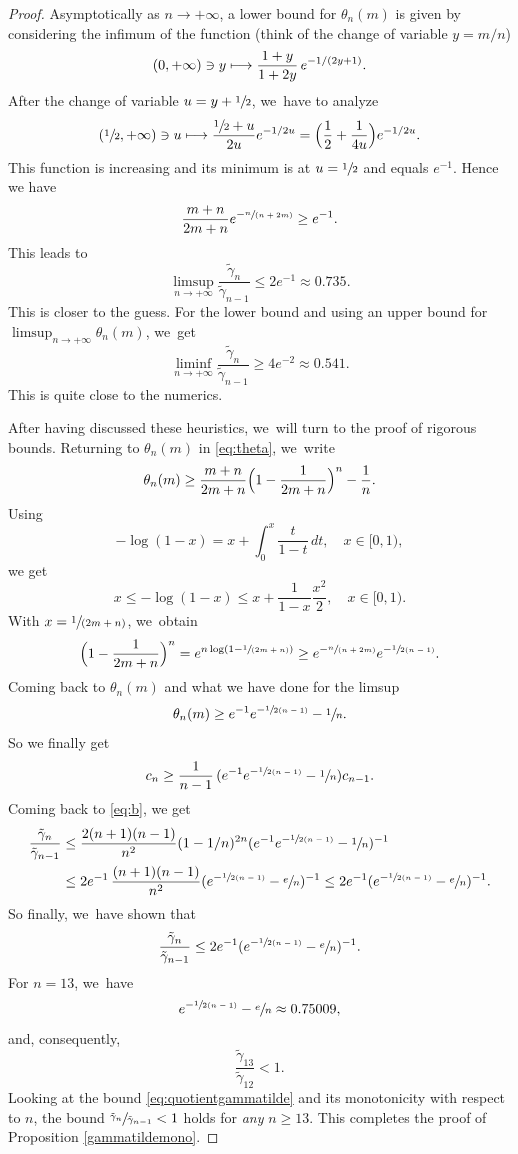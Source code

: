 \documentclass[11pt]{article}
\newcommand\mto{\mathchoice{\longmapsto}{\mapsto}{\mapsto}{\mapsto}}
\let\oldsfrac\sfrac
\renewcommand{\sfrac}[2]{{\oldsfrac{#1}{#2}}}
\newcommand{\spfrac}[2]{{\sfrac{#1}{(#2)}}}
\theoremstyle{definition}
\newcommand{\1}{\mathbbm{1}}
\numberwithin{equation}{section}
\begin{document}
\begin{proof}
Asymptotically as $n\to +\infty$, a lower bound for $\theta_n(m)$ is given by considering the infimum of the function (think of the change of variable $y=m/n$)
\[
(0,+\infty) \ni y \mto \frac{1+y}{1+2y}\,e^{-1/(2y+1)}.
\]
After the change of variable $u=y+\sfrac 12$, we~have to analyze
\[
(\sfrac 12,+\infty) \ni u \mto \frac{\sfrac12 +u}{2u} e^{-1/2u}= \Bigl(\frac 12 + \frac{1}{4u}\Bigr) e^{-1/2u}.
\]
This function is increasing and its minimum is at $u=\sfrac 12$ and equals $e^{-1}$. Hence we have
\begin{equation}
\frac{m+n}{2m+n}e^{- \spfrac{n}{n+2m}} \geq e^{-1}.
\end{equation}
This leads to
\begin{equation}\label{eq:expdecaytildegammanupper}
\limsup_{n\to +\infty} \frac{\tilde\gamma_n}{\tilde\gamma_{n-1}} \leq 2 e^{-1} \approx 0.735.
\end{equation}
This is closer to the guess.
For the lower bound and using an upper bound for $\limsup_{n\to +\infty} \theta_n(m)$, we~get
\[
\liminf_{n\to +\infty} \frac{\tilde\gamma_n}{\tilde\gamma_{n-1}} \geq 4 e^{-2} \approx 0.541.
\]
This is quite close to the numerics.

After having discussed these heuristics, we~will turn to the proof of rigorous bounds. Returning to $\theta_n(m)$ in \eqref{eq:theta}, we~write
\[
\theta_n(m)\geq \frac{m+n}{2m+n} \Bigl(1- \frac{1}{2m+n}\Bigr)^n - \frac 1n.
\]
Using
\[
- \log (1-x) = x + \int_0^x \frac{t}{1-t} \,dt,\quad x\in [0,1),
\]
we get
\[
x\leq - \log (1-x) \leq x + \frac{1}{1-x} \frac{x^2}{2},\quad x\in [0,1).
\]
With $x=\spfrac{1}{2m+n}$, we~obtain
\[
\Bigl(1- \frac{1}{2m+n}\Bigr)^n= e^{n \log (1- \spfrac{1}{2m+n})}\geq e^{- \spfrac{n}{n+2m} } e^{ - \sfrac{1}{2 (n-1)}}.
\]
Coming back to $\theta_n(m)$ and what we have done for the limsup
\[
\theta_n(m)\geq e^{-1} e^{- \sfrac {1}{2(n-1)}} -\sfrac 1n.
\]
So we finally get
\[
c_n \geq \frac{1}{n-1} \,(e^{-1} e^{- \sfrac 1{2(n-1)}} -\sfrac 1n) c_{n-1}.
\]
Coming back to \eqref{eq:b},
we get
\begin{align*}
\frac{\tilde\gamma_n}{\tilde\gamma_{n-1}}
& \leq \frac{2(n+1)(n-1)}{n^2}(1-1/n)^{2n}(e^{-1} e^{- \sfrac {1}{2(n-1)}} -\sfrac 1n)^{-1} \\
& \leq 2 e^{-1} \,\frac{(n+1)(n-1)}{n^2}(e^{- \sfrac 1{2(n-1)}} -\sfrac en)^{-1} \leq 2 e^{-1}(e^{- \sfrac {1}{2(n-1)}} -\sfrac en)^{-1}.
\end{align*}
So finally, we~have shown that
\begin{equation}\label{eq:quotientgammatilde}
\frac{\tilde\gamma_n}{\tilde\gamma_{n-1}} \leq 2 e^{-1}(e^{- \sfrac {1}{2(n-1)}} -\sfrac en)^{-1}.
\end{equation}
For $n=13$, we~have
\begin{equation} \label{eq:9.9}
e^{- \sfrac 1{2(n-1)}} -\sfrac en \approx 0.75009,
\end{equation}
and, consequently,
\[
\frac{\tilde\gamma_{13}}{\tilde\gamma_{12}} <1.
\]
Looking at the bound \eqref{eq:quotientgammatilde} and its monotonicity with respect to $n$, the bound $\sfrac{\tilde\gamma_n}{\tilde\gamma_{n-1}}<1$ holds for \emph{any} $n\geq 13$. This completes the proof of Proposition \ref{gammatildemono}.
\end{proof}
\end{document}
